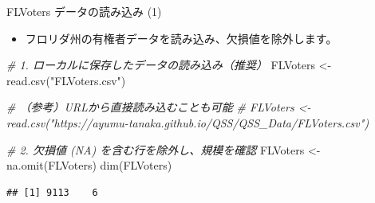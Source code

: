 \documentclass[
  ignorenonframetext,
]{beamer}
\newenvironment{Shaded}{\begin{snugshade}}{\end{snugshade}}
\newcommand{\CommentTok}[1]{\textcolor[rgb]{0.56,0.35,0.01}{\textit{#1}}}
\newcommand{\FunctionTok}[1]{\textcolor[rgb]{0.00,0.00,0.00}{#1}}
\newcommand{\NormalTok}[1]{#1}
\newcommand{\OtherTok}[1]{\textcolor[rgb]{0.56,0.35,0.01}{#1}}
\newcommand{\StringTok}[1]{\textcolor[rgb]{0.31,0.60,0.02}{#1}}
\providecommand{\tightlist}{%
  \setlength{\itemsep}{0pt}\setlength{\parskip}{0pt}}
\begin{document}
\begin{frame}[fragile]{FLVoters データの読み込み (1)}
\protect\hypertarget{flvoters-ux30c7ux30fcux30bfux306eux8aadux307fux8fbcux307f-1}{}
\begin{itemize}
\tightlist
\item
  フロリダ州の有権者データを読み込み、欠損値を除外します。
\end{itemize}

\scriptsize

\begin{Shaded}
\begin{Highlighting}[]
\CommentTok{\# 1. ローカルに保存したデータの読み込み（推奨）}
\NormalTok{FLVoters }\OtherTok{\textless{}{-}} \FunctionTok{read.csv}\NormalTok{(}\StringTok{"FLVoters.csv"}\NormalTok{)}

\CommentTok{\# （参考）URLから直接読み込むことも可能}
\CommentTok{\# FLVoters \textless{}{-} read.csv("https://ayumu{-}tanaka.github.io/QSS/QSS\_Data/FLVoters.csv")}

\CommentTok{\# 2. 欠損値 (NA) を含む行を除外し、規模を確認}
\NormalTok{FLVoters }\OtherTok{\textless{}{-}} \FunctionTok{na.omit}\NormalTok{(FLVoters)}
\FunctionTok{dim}\NormalTok{(FLVoters)}
\end{Highlighting}
\end{Shaded}

\begin{verbatim}
## [1] 9113    6
\end{verbatim}

\normalsize
\end{frame}
\end{document}
